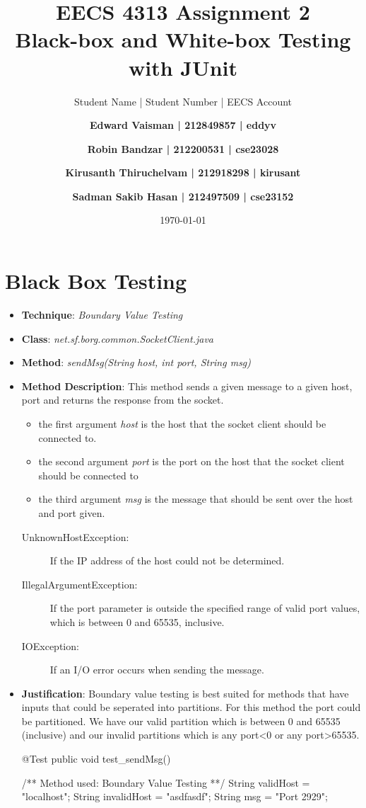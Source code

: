 \documentclass[fontsize=12pt,paper=letter,twoside]{scrartcl}
\author{Student Name | Student Number | EECS Account
\and \textbf{Edward Vaisman | 212849857 | eddyv}
\and \textbf{Robin Bandzar | 212200531 | cse23028}
\and \textbf{Kirusanth Thiruchelvam | 212918298 | kirusant}
\and \textbf{Sadman Sakib Hasan | 212497509 | cse23152}
}
\date{\today} %
\begin{document}
\title{EECS 4313 Assignment 2 \\Black-box and White-box Testing with JUnit}
\maketitle

\newpage

\tableofcontents


\newpage



\section{Black Box Testing}
\begin{itemize}
\item \textbf{Technique}: \emph{Boundary Value Testing}
\item \textbf{Class}: \emph{net.sf.borg.common.SocketClient.java}
\item \textbf{Method}: \emph{sendMsg(String host, int port, String msg)}
\item \textbf{Method Description}:
This method sends a given message to a given host, port and returns the response from the socket.
\begin{itemize}
\item the first argument \emph{host} is the host that the socket client should be connected to.
\item the second argument \emph{port} is the port on the host that the socket client should be connected to
\item the third argument \emph{msg} is the message that should be sent over the host and port given.
\end{itemize}
\begin{description}
\item[UnknownHostException:] If the IP address of the host could not be determined.
\item[IllegalArgumentException:] If the port parameter is outside the specified range of valid port values, which is between 0 and 65535, inclusive.
\item[IOException:] If an I/O error occurs when sending the message.
\end{description}
\item \textbf{Justification}: Boundary value testing is best suited for methods that have inputs that could be seperated into partitions. For this method the port could be partitioned. We have our valid partition which is between 0 and 65535 (inclusive) and our invalid partitions which is any  port\textless 0 or any port\textgreater 65535.
\newpage
\begin{code}	@Test
	public void test_sendMsg() {
		/** Method used: Boundary Value Testing **/
		String validHost = "localhost";
		String invalidHost = "asdfasdf";
		String msg = "Port 2929";

}
\end{code}
\end{itemize}
\end{document}
